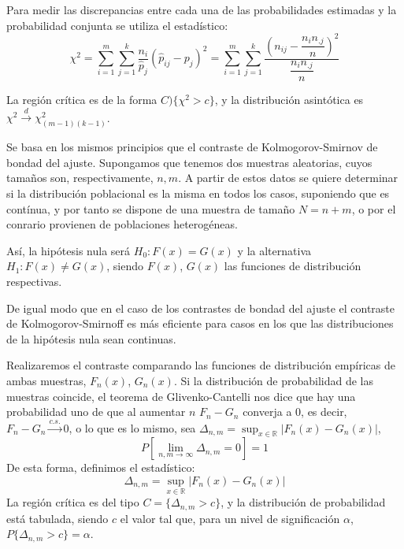 Para medir las discrepancias entre cada una de las probabilidades estimadas y la probabilidad conjunta se utiliza el estad\'istico:
\[\chi^2=\sum_{i=1}^m\sum_{j=1}^k\dfrac{n_i}{\hat{p}_{j}}(\hat{p}_{ij}-p_j)^2=\sum_{i=1}^m\sum_{j=1}^k\dfrac{(n_{ij}-\dfrac{n_in_{.j}}{n})^2}{\dfrac{n_in_{.j}}{n}}\]

La regi\'on cr\'itica es de la forma $C)\{\chi^2>c\}$, y la distribuci\'on asint\'otica es $\chi^2\overset{d}{\to}\chi^2_{(m-1)(k-1)}$.


Se basa en los mismos principios que el contraste de Kolmogorov-Smirnov de bondad del ajuste. Supongamos que tenemos dos muestras aleatorias, cuyos tama\~nos son, respectivamente, $n, m$. A partir de estos datos se quiere determinar si la distribuci\'on poblacional es la misma en todos los casos, suponiendo que es cont\'inua, y por tanto se dispone de una muestra de tama\~no $N=n+m$, o por el conrario provienen de poblaciones heterog\'eneas.

As\'i, la hip\'otesis nula ser\'a $H_0:F(x)=G(x)$ y la alternativa $H_1:F(x)\neq G(x)$, siendo $F(x)$, $G(x)$ las funciones de distribuci\'on respectivas.

De igual modo que en el caso de los contrastes de bondad del ajuste el contraste de Kolmogorov-Smirnoff es m\'as eficiente para casos en los que las distribuciones de la hip\'otesis nula sean continuas.

Realizaremos el contraste comparando las funciones de distribuci\'on emp\'iricas de ambas muestras, $F_n(x)$, $G_n(x)$. Si la distribuci\'on de probabilidad de las muestras coincide, el teorema de Glivenko-Cantelli nos dice que hay una probabilidad uno de que al aumentar $n$ $F_n-G_n$ converja a $0$, es decir, $F_n-G_n\overset{c.s.}{\to}0$, o lo que es lo mismo, sea $\Delta_{n,m}=\sup_{x\in\mathbb{R}}|F_n(x)-G_n(x)|$,
\[P\left[\lim_{n,m\to\infty}\Delta_{n,m}=0\right]=1\]
De esta forma, definimos el estad\'istico:
\[ \Delta_{n,m}=\sup_{x\in\mathbb{R}}|F_n(x)-G_n(x)| \]
La regi\'on cr\'itica es del tipo $C=\{\Delta_{n,m}>c\}$, y la distribuci\'on de probabilidad est\'a tabulada, siendo $c$ el valor tal que, para un nivel de significaci\'on $\alpha$, $P\{\Delta_{n,m}>c\}=\alpha$.

